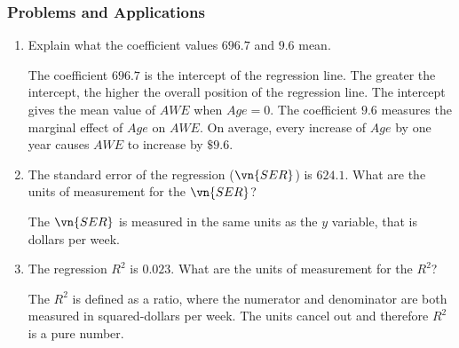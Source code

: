 \begin{frame}
\frametitle{Problems and Applications}
\ask

\begin{enumerate}\setcounter{enumi}{0}

\item Explain what the coefficient values $696.7$ and $9.6$ mean.

\begin{answer}
The coefficient $696.7$ is the intercept of the regression line. The greater the intercept, the higher the overall position of the regression line. The intercept gives the mean value of $AWE$ when $Age=0$. 
The coefficient $9.6$ measures the marginal effect of $Age$ on $AWE$. On average, every increase of $Age$ by one year causes $AWE$ to increase by $\$9.6$. 
\end{answer}

\item The standard error of the regression ($\vn{SER}$) is $624.1$. What are the units of measurement for the $\vn{SER}$?

\begin{answer}
The $\vn{SER}$ is measured in the same units as the $y$ variable, that is dollars per week.
\end{answer}

\item The regression $R^2$ is $0.023$. What are the units of measurement for the $R^2$?

\begin{answer}
The $R^2$ is defined as a ratio, where the numerator and denominator are both measured in squared-dollars per week. The units cancel out and therefore $R^2$ is a pure number. 
\end{answer}

\end{enumerate}
\end{frame}


